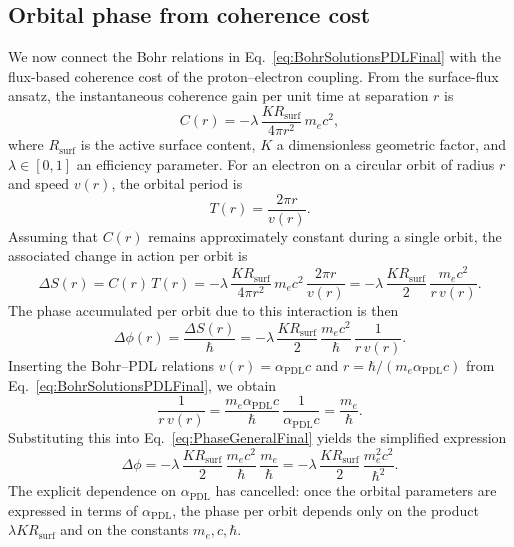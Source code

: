 \documentclass[11pt,a4paper]{article}
\begin{document}
\subsection{Orbital phase from coherence cost}

We now connect the Bohr relations in Eq.~\eqref{eq:BohrSolutionsPDLFinal} with the flux-based coherence cost of the proton--electron coupling. From the surface-flux ansatz, the instantaneous coherence gain per unit time at separation \(r\) is
\begin{equation}
C(r) = -\lambda \,\frac{K R_{\mathrm{surf}}}{4\pi r^{2}} \,m_e c^{2},
\end{equation}
where \(R_{\mathrm{surf}}\) is the active surface content, \(K\) a dimensionless geometric factor, and \(\lambda \in [0,1]\) an efficiency parameter. For an electron on a circular orbit of radius \(r\) and speed \(v(r)\), the orbital period is
\begin{equation}
T(r) = \frac{2\pi r}{v(r)}.
\end{equation}
Assuming that \(C(r)\) remains approximately constant during a single orbit, the associated change in action per orbit is
\begin{equation}
\Delta S(r) = C(r)\,T(r) = -\lambda \,\frac{K R_{\mathrm{surf}}}{4\pi r^{2}} \,m_e c^{2}\,\frac{2\pi r}{v(r)} = -\lambda \,\frac{K R_{\mathrm{surf}}}{2}\,\frac{m_e c^{2}}{r\,v(r)}.
\label{eq:DeltaSFinal}
\end{equation}
The phase accumulated per orbit due to this interaction is then
\begin{equation}
\Delta \phi(r) = \frac{\Delta S(r)}{\hbar} = -\lambda \,\frac{K R_{\mathrm{surf}}}{2}\,\frac{m_e c^{2}}{\hbar}\,\frac{1}{r\,v(r)}.
\label{eq:PhaseGeneralFinal}
\end{equation}
Inserting the Bohr--PDL relations \(v(r) = \alpha_{\mathrm{PDL}} c\) and \(r = \hbar/(m_e \alpha_{\mathrm{PDL}} c)\) from Eq.~\eqref{eq:BohrSolutionsPDLFinal}, we obtain
\begin{equation}
\frac{1}{r\,v(r)} = \frac{m_e \alpha_{\mathrm{PDL}} c}{\hbar}\,\frac{1}{\alpha_{\mathrm{PDL}} c} = \frac{m_e}{\hbar}.
\end{equation}
Substituting this into Eq.~\eqref{eq:PhaseGeneralFinal} yields the simplified expression
\begin{equation}
\Delta \phi = -\lambda \,\frac{K R_{\mathrm{surf}}}{2}\,\frac{m_e c^{2}}{\hbar}\,\frac{m_e}{\hbar} = -\lambda \,\frac{K R_{\mathrm{surf}}}{2}\,\frac{m_e^{2} c^{2}}{\hbar^{2}}.
\label{eq:PhaseSimplifiedFinal}
\end{equation}
The explicit dependence on \(\alpha_{\mathrm{PDL}}\) has cancelled: once the orbital parameters are expressed in terms of \(\alpha_{\mathrm{PDL}}\), the phase per orbit depends only on the product \(\lambda K R_{\mathrm{surf}}\) and on the constants \(m_e, c, \hbar\).
\end{document}
